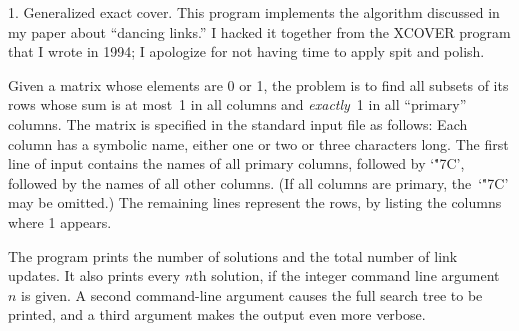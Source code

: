 
\datethis

 1. Generalized exact cover.
This program implements the algorithm discussed in my paper about ``dancing
links.'' I hacked it together from the {\mc XCOVER} program that I wrote in
1994; I apologize for not having time to apply spit and polish.

Given a matrix whose elements are 0 or 1, the problem is to
find all subsets of its rows whose sum is at most~1 in all columns and
{\it exactly\/}~1 in all ``primary'' columns. The matrix is specified
in the standard input file as follows: Each column has a symbolic name,
either one or two or three characters long. The first line of input contains
the names of all primary columns, followed by `\.{\char"7C}', followed by
the names of all other columns.
(If all columns are primary, the~`\.{\char"7C}' may be omitted.)
The remaining lines represent the rows, by listing the columns where 1 appears.

The program prints the number of solutions and the total number of link
updates. It also prints every $n$th solution, if the integer command
line argument $n$ is given. A second command-line argument causes the
full search tree to be printed, and a third argument makes the output
even more verbose.

